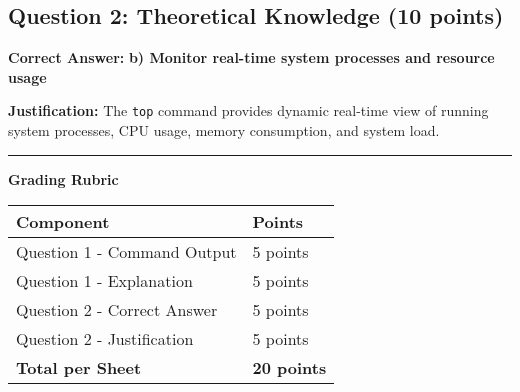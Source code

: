 \documentclass[a4paper,11pt]{article}
\begin{document}
\subsection*{Question 2: Theoretical Knowledge (10 points)}

\textbf{Correct Answer:} \textcolor{successgreen}{\textbf{b) Monitor real-time system processes and resource usage}}

\textbf{Justification:} The \texttt{top} command provides dynamic real-time view of running system processes, CPU usage, memory consumption, and system load.

\vspace{5mm}

\begin{center}
\rule{0.5\textwidth}{0.5pt}

\textbf{Grading Rubric}

\begin{tabular}{ll}
\toprule
\textbf{Component} & \textbf{Points} \\
\midrule
Question 1 - Command Output & 5 points \\
Question 1 - Explanation & 5 points \\
Question 2 - Correct Answer & 5 points \\
Question 2 - Justification & 5 points \\
\midrule
\textbf{Total per Sheet} & \textbf{20 points} \\
\bottomrule
\end{tabular}
\end{center}
\end{document}
